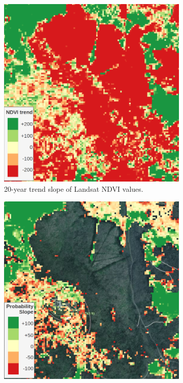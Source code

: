 \begin{figure}[H]
\begin{subfigure}[t]{0.24\textwidth}
        \includegraphics[width=\linewidth,height=\linewidth]{figs_06/brocken_ndvi_trend_withlegend.png}
        \caption{20-year trend slope of Landsat NDVI values.}
        \label{fig:brocken_ndvi}
        \end{subfigure}
        \hfill
        \begin{subfigure}[t]{0.24\textwidth}
        \centering
        \includegraphics[width=\linewidth,height=\linewidth]{figs_06/brocken_pslope_withlegend.png}

\end{subfigure}
\end{figure}
